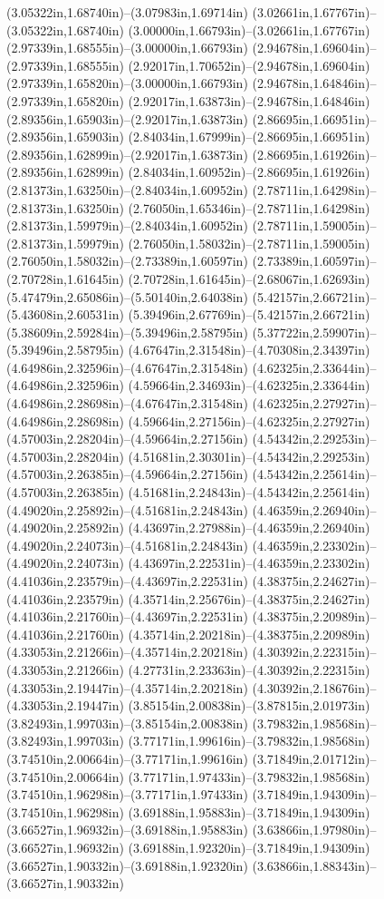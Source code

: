 (3.05322in,1.68740in)--(3.07983in,1.69714in) (3.02661in,1.67767in)--(3.05322in,1.68740in) (3.00000in,1.66793in)--(3.02661in,1.67767in) (2.97339in,1.68555in)--(3.00000in,1.66793in) (2.94678in,1.69604in)--(2.97339in,1.68555in) (2.92017in,1.70652in)--(2.94678in,1.69604in) (2.97339in,1.65820in)--(3.00000in,1.66793in) (2.94678in,1.64846in)--(2.97339in,1.65820in) (2.92017in,1.63873in)--(2.94678in,1.64846in) (2.89356in,1.65903in)--(2.92017in,1.63873in) (2.86695in,1.66951in)--(2.89356in,1.65903in) (2.84034in,1.67999in)--(2.86695in,1.66951in) (2.89356in,1.62899in)--(2.92017in,1.63873in) (2.86695in,1.61926in)--(2.89356in,1.62899in) (2.84034in,1.60952in)--(2.86695in,1.61926in) (2.81373in,1.63250in)--(2.84034in,1.60952in) (2.78711in,1.64298in)--(2.81373in,1.63250in) (2.76050in,1.65346in)--(2.78711in,1.64298in) (2.81373in,1.59979in)--(2.84034in,1.60952in) (2.78711in,1.59005in)--(2.81373in,1.59979in) (2.76050in,1.58032in)--(2.78711in,1.59005in) (2.76050in,1.58032in)--(2.73389in,1.60597in) (2.73389in,1.60597in)--(2.70728in,1.61645in) (2.70728in,1.61645in)--(2.68067in,1.62693in) (5.47479in,2.65086in)--(5.50140in,2.64038in) (5.42157in,2.66721in)--(5.43608in,2.60531in) (5.39496in,2.67769in)--(5.42157in,2.66721in) (5.38609in,2.59284in)--(5.39496in,2.58795in) (5.37722in,2.59907in)--(5.39496in,2.58795in) (4.67647in,2.31548in)--(4.70308in,2.34397in) (4.64986in,2.32596in)--(4.67647in,2.31548in) (4.62325in,2.33644in)--(4.64986in,2.32596in) (4.59664in,2.34693in)--(4.62325in,2.33644in) (4.64986in,2.28698in)--(4.67647in,2.31548in) (4.62325in,2.27927in)--(4.64986in,2.28698in) (4.59664in,2.27156in)--(4.62325in,2.27927in) (4.57003in,2.28204in)--(4.59664in,2.27156in) (4.54342in,2.29253in)--(4.57003in,2.28204in) (4.51681in,2.30301in)--(4.54342in,2.29253in) (4.57003in,2.26385in)--(4.59664in,2.27156in) (4.54342in,2.25614in)--(4.57003in,2.26385in) (4.51681in,2.24843in)--(4.54342in,2.25614in) (4.49020in,2.25892in)--(4.51681in,2.24843in) (4.46359in,2.26940in)--(4.49020in,2.25892in) (4.43697in,2.27988in)--(4.46359in,2.26940in) (4.49020in,2.24073in)--(4.51681in,2.24843in) (4.46359in,2.23302in)--(4.49020in,2.24073in) (4.43697in,2.22531in)--(4.46359in,2.23302in) (4.41036in,2.23579in)--(4.43697in,2.22531in) (4.38375in,2.24627in)--(4.41036in,2.23579in) (4.35714in,2.25676in)--(4.38375in,2.24627in) (4.41036in,2.21760in)--(4.43697in,2.22531in) (4.38375in,2.20989in)--(4.41036in,2.21760in) (4.35714in,2.20218in)--(4.38375in,2.20989in) (4.33053in,2.21266in)--(4.35714in,2.20218in) (4.30392in,2.22315in)--(4.33053in,2.21266in) (4.27731in,2.23363in)--(4.30392in,2.22315in) (4.33053in,2.19447in)--(4.35714in,2.20218in) (4.30392in,2.18676in)--(4.33053in,2.19447in) (3.85154in,2.00838in)--(3.87815in,2.01973in) (3.82493in,1.99703in)--(3.85154in,2.00838in) (3.79832in,1.98568in)--(3.82493in,1.99703in) (3.77171in,1.99616in)--(3.79832in,1.98568in) (3.74510in,2.00664in)--(3.77171in,1.99616in) (3.71849in,2.01712in)--(3.74510in,2.00664in) (3.77171in,1.97433in)--(3.79832in,1.98568in) (3.74510in,1.96298in)--(3.77171in,1.97433in) (3.71849in,1.94309in)--(3.74510in,1.96298in) (3.69188in,1.95883in)--(3.71849in,1.94309in) (3.66527in,1.96932in)--(3.69188in,1.95883in) (3.63866in,1.97980in)--(3.66527in,1.96932in) (3.69188in,1.92320in)--(3.71849in,1.94309in) (3.66527in,1.90332in)--(3.69188in,1.92320in) (3.63866in,1.88343in)--(3.66527in,1.90332in) 